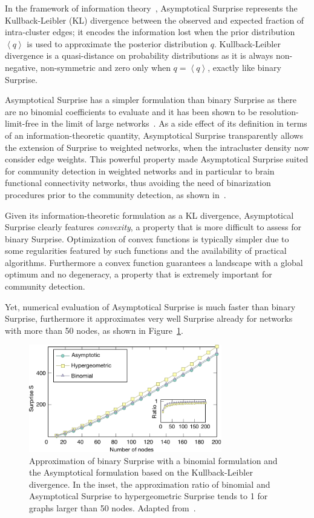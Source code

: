 In the framework of information theory~\cite{cover2006}, Asymptotical Surprise represents the Kullback-Leibler (KL) divergence between the observed and expected fraction of intra-cluster edges; it encodes the information lost when the prior distribution $\left <q \right >$ is used to approximate the posterior distribution $q$. Kullback-Leibler divergence is a quasi-distance on probability distributions as it is always non-negative, non-symmetric and zero only when $q=\left< q \right>$, exactly like binary Surprise.

Asymptotical Surprise has a simpler formulation than binary Surprise as there are no binomial coefficients to evaluate and it has been shown to be resolution-limit-free in the limit of large networks~\cite{traag2015}.
As a side effect of its definition in terms of an information-theoretic quantity, Asymptotical Surprise transparently allows the extension of Surprise to weighted networks, when the intracluster density now consider edge weights.
This powerful property made Asymptotical Surprise suited for community detection in weighted networks and in particular to brain functional connectivity networks, thus avoiding the need of binarization procedures prior to the community detection, as shown in~\cite{nicolini2017}.

Given its information-theoretic formulation as a KL divergence, Asymptotical Surprise clearly features \emph{convexity}, a property that is more difficult to assess for binary Surprise.
Optimization of convex functions is typically simpler due to some regularities featured by such functions and the availability of practical algorithms.
Furthermore a convex function guarantees a landscape with a global optimum and no degeneracy, a property that is extremely important for community detection.

Yet, numerical evaluation of Asymptotical Surprise is much faster than binary Surprise, furthermore it approximates very well Surprise already for networks with more than 50 nodes, as shown in Figure~\ref{fig:asymptotical_surprise_comparison}.

\begin{figure}[!htb]
\centering
\includegraphics[width=0.75\textwidth]{images/asymptotical_surprise_comparison.pdf}
\caption{Approximation of binary Surprise with a binomial formulation and the Asymptotical formulation based on the Kullback-Leibler divergence. In the inset, the approximation ratio of binomial and Asymptotical Surprise to hypergeometric Surprise tends to 1 for graphs larger than 50 nodes. Adapted from~\cite{traag2015}.}
\label{fig:asymptotical_surprise_comparison}
\end{figure}

